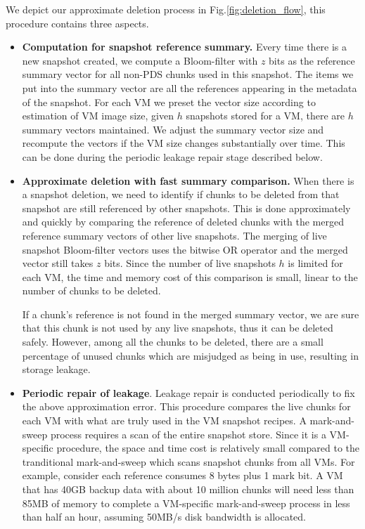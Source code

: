 We depict our approximate deletion process in Fig.\ref{fig:deletion_flow}, this procedure contains three aspects.
\begin{itemize}
\item {\bf Computation for snapshot reference summary.}
Every time there is a new snapshot created,
we compute a Bloom-filter with $z$ bits as the reference summary vector for all non-PDS chunks used 
in this snapshot.
The items we put into the summary vector are all the references appearing in the metadata of the snapshot.
For each VM we preset the vector size according to  estimation of VM image size,
given $h$ snapshots stored for a VM, there are $h$ summary vectors maintained.
We adjust the summary vector size and recompute the vectors if the VM size changes substantially over time.
This can be done during the periodic leakage repair stage described below.

\item {\bf Approximate deletion with fast summary comparison.}
When there is a snapshot deletion,  
we need to identify if chunks to be deleted from that snapshot
are still referenced by other snapshots. 
This is done approximately and quickly by comparing the 
reference of deleted chunks  with
the merged reference summary vectors of other live snapshots.
The merging of live snapshot Bloom-filter vectors uses the bitwise OR operator 
and the merged vector still takes $z$ bits.
Since the number of live snapshots $h$ is limited for
each VM, 
the time and memory cost of this comparison is small, linear to the number of chunks to be deleted.

If a chunk's reference is not found in the merged summary vector, we are sure that
this chunk is not used by any live snapshots, thus it can be deleted safely.
However, among all the chunks to be deleted, 
there are a small percentage of unused chunks  which
are misjudged as  being in use, resulting in storage leakage.

\item {\bf Periodic repair of leakage}.
Leakage repair is conducted periodically to fix the above approximation error.
This procedure compares the live chunks for each VM with what are truly used in the VM snapshot recipes.
A mark-and-sweep process  requires a scan of the entire snapshot store.
Since it is a VM-specific procedure, 
the space and time cost is relatively small compared to the tranditional mark-and-sweep
which scans snapshot chunks from all VMs.
For example, consider each reference consumes 8 bytes plus  1 mark bit. A VM that has 40GB backup data with about
10 million chunks will need less than 85MB of memory to complete a VM-specific mark-and-sweep process
in less than half an hour, assuming 50MB/s disk bandwidth is allocated.
\end{itemize}

